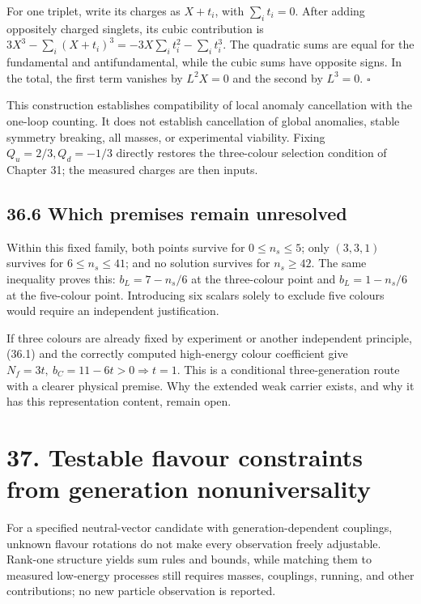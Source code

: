 \documentclass[
  11pt,
  oneside]{book}
\begin{document}
For one triplet, write its charges as \(X+t_i\), with \(\sum_i t_i=0\).
After adding oppositely charged singlets, its cubic contribution is
\(3X^3-\sum_i(X+t_i)^3=-3X\sum_i t_i^2-\sum_i t_i^3\). The quadratic
sums are equal for the fundamental and antifundamental, while the cubic
sums have opposite signs. In the total, the first term vanishes by
\(L^2X=0\) and the second by \(L^3=0\). \(\square\)

This construction establishes compatibility of local anomaly
cancellation with the one-loop counting. It does not establish
cancellation of global anomalies, stable symmetry breaking, all masses,
or experimental viability. Fixing \(Q_u=2/3,Q_d=-1/3\) directly restores
the three-colour selection condition of Chapter 31; the measured charges
are then inputs.

\section{36.6 Which premises remain unresolved}

Within this fixed family, both points survive for \(0\le n_s\le5\); only
\((3,3,1)\) survives for \(6\le n_s\le41\); and no solution survives for
\(n_s\ge42\). The same inequality proves this: \(b_L=7-n_s/6\) at the
three-colour point and \(b_L=1-n_s/6\) at the five-colour point.
Introducing six scalars solely to exclude five colours would require an
independent justification.

If three colours are already fixed by experiment or another independent
principle, (36.1) and the correctly computed high-energy colour
coefficient give \(N_f=3t,\ b_C=11-6t>0\Rightarrow t=1\). This is a
conditional three-generation route with a clearer physical premise. Why
the extended weak carrier exists, and why it has this representation
content, remain open.

\chapter{37. Testable flavour constraints from generation
nonuniversality}\label{ch-37}

For a specified neutral-vector candidate with generation-dependent
couplings, unknown flavour rotations do not make every observation
freely adjustable. Rank-one structure yields sum rules and bounds, while
matching them to measured low-energy processes still requires masses,
couplings, running, and other contributions; no new particle observation
is reported.
\end{document}
